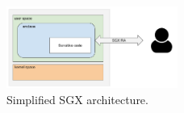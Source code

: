 %

\begin{figure}[t]
	\centering
	\includegraphics[width=0.5\textwidth]{fig_c1/sgx-architecture.pdf}
	\caption[SGX architecture.]{Simplified SGX architecture.}
	\label{fig:sgx-architecture}
\end{figure}

